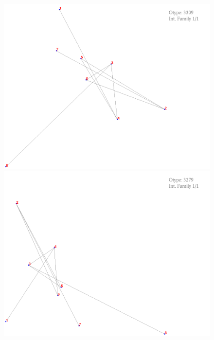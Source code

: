 \documentclass[11pt,epsf,times,letterpaper]{article}
\begin{document}
	\begin{figure}
		\includegraphics[scale=.4]{if_tam0_tam1/11.png}
		\includegraphics[scale=.4]{if_tam0_tam1/12.png}
	\end{figure}
\end{document}

